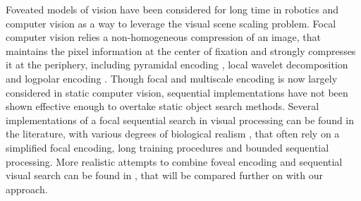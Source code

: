 Foveated models of vision have been considered for long time in robotics and computer vision as a way to leverage the visual scene scaling problem. Focal computer vision relies a non-homogeneous compression of an image, that maintains the pixel information at the center of fixation and strongly compresses it at the periphery, including pyramidal encoding \cite{kortum1996implementation,Butko2010infomax}, local wavelet decomposition \cite{dauce2018active} and logpolar encoding \cite{fischer2007self,Traver10}. Though focal and multiscale encoding is now largely considered in static computer vision, sequential implementations have not been shown effective enough to overtake static object search methods. Several implementations of a focal sequential search in visual processing can be found in the literature, with various degrees of biological realism \cite{mnih2014recurrent,fu2017look}, that often rely on a simplified focal encoding, long training procedures and bounded sequential processing. More realistic attempts to combine foveal encoding and sequential visual search can be found in \cite{Butko2010infomax,denil2012learning,dauce2018active}, that will be compared further on with our approach.


